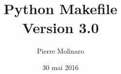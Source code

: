 \documentclass[a4paper,11pt]{extarticle}
\begin{document}
 


\title{\bf \Huge{Python Makefile\\Version 3.0}}
\author{Pierre Molinaro}
\date {30 mai 2016}

\maketitle


\tableofcontents

\end{document}
